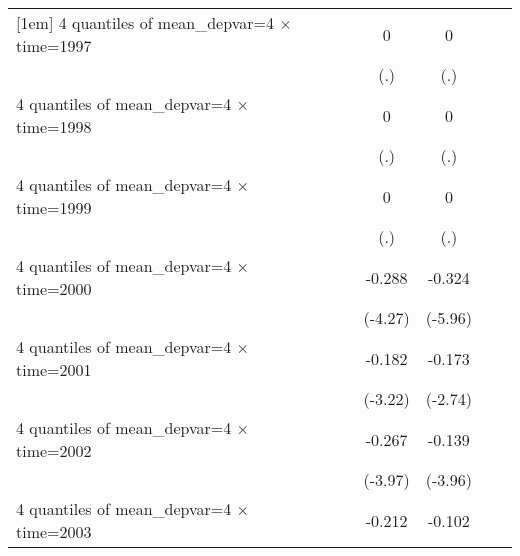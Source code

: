 \begin{table}[htbp]
\begin{tabular}{l*{6}{c}}
[1em]
4 quantiles of mean\_depvar=4 $\times$ time=1997&                     &                     &           0         &           0         &                     &                     \\
                    &                     &                     &         (.)         &         (.)         &                     &                     \\
[1em]
4 quantiles of mean\_depvar=4 $\times$ time=1998&                     &                     &           0         &           0         &                     &                     \\
                    &                     &                     &         (.)         &         (.)         &                     &                     \\
[1em]
4 quantiles of mean\_depvar=4 $\times$ time=1999&                     &                     &           0         &           0         &                     &                     \\
                    &                     &                     &         (.)         &         (.)         &                     &                     \\
[1em]
4 quantiles of mean\_depvar=4 $\times$ time=2000&                     &                     &      -0.288\sym{***}&      -0.324\sym{***}&                     &                     \\
                    &                     &                     &     (-4.27)         &     (-5.96)         &                     &                     \\
[1em]
4 quantiles of mean\_depvar=4 $\times$ time=2001&                     &                     &      -0.182\sym{***}&      -0.173\sym{**} &                     &                     \\
                    &                     &                     &     (-3.22)         &     (-2.74)         &                     &                     \\
[1em]
4 quantiles of mean\_depvar=4 $\times$ time=2002&                     &                     &      -0.267\sym{***}&      -0.139\sym{***}&                     &                     \\
                    &                     &                     &     (-3.97)         &     (-3.96)         &                     &                     \\
[1em]
4 quantiles of mean\_depvar=4 $\times$ time=2003&                     &                     &      -0.212\sym{***}&      -0.102\sym{***}&                     &                     \\

\end{tabular}
\end{table}

